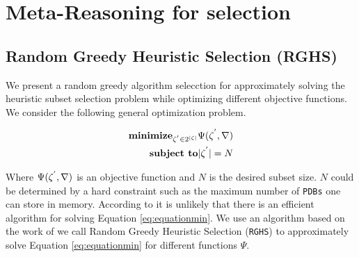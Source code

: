 
 
\chapter{Meta-Reasoning for selection}\label{ch:rghs}


\section{Random Greedy Heuristic Selection (RGHS)}
\noindent
We present a random greedy algorithm selecction for approximately solving the heuristic subset selection problem while optimizing different objective functions. We consider the following general optimization problem.

\begin{equation}
\begin{split}
\textbf{minimize}_{\zeta\sp{'} \in 2\sp{|\zeta|}}\Psi(\zeta\sp{'}, \nabla) \\
\textbf{subject to} |\zeta\sp{'}| = N
\end{split}
\label{eq:equationmin}
\end{equation}

Where $\Psi(\zeta\sp{'},\nabla)$ is an objective function and $N$ is the desired subset size. $N$ could be determined by a hard constraint such as the maximum number of \texttt{PDBs} one can store in memory. According to \cite{raynersss13} it is unlikely that there is an efficient algorithm for solving Equation \ref{eq:equationmin}. We use an algorithm based on the work of \cite{buchbinder2014submodular} we call Random Greedy Heuristic Selection (\texttt{RGHS}) to approximately solve Equation \ref{eq:equationmin} for different functions $\Psi$.\\

